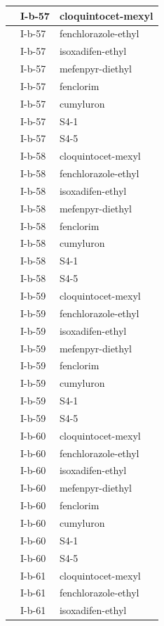 \documentclass[11pt,a4paper]{article}
\begin{document}
\begin{table}[h]
\begin{tabular}{|l|l|l|}
 & I-b-57 & cloquintocet-mexyl \\ \hline
 & I-b-57 & fenchlorazole-ethyl \\ \hline
 & I-b-57 & isoxadifen-ethyl \\ \hline
 & I-b-57 & mefenpyr-diethyl \\ \hline
 & I-b-57 & fenclorim \\ \hline
 & I-b-57 & cumyluron \\ \hline
 & I-b-57 & S4-1 \\ \hline
 & I-b-57 & S4-5 \\ \hline
 & I-b-58 & cloquintocet-mexyl \\ \hline
 & I-b-58 & fenchlorazole-ethyl \\ \hline
 & I-b-58 & isoxadifen-ethyl \\ \hline
 & I-b-58 & mefenpyr-diethyl \\ \hline
 & I-b-58 & fenclorim \\ \hline
 & I-b-58 & cumyluron \\ \hline
 & I-b-58 & S4-1 \\ \hline
 & I-b-58 & S4-5 \\ \hline
 & I-b-59 & cloquintocet-mexyl \\ \hline
 & I-b-59 & fenchlorazole-ethyl \\ \hline
 & I-b-59 & isoxadifen-ethyl \\ \hline
 & I-b-59 & mefenpyr-diethyl \\ \hline
 & I-b-59 & fenclorim \\ \hline
 & I-b-59 & cumyluron \\ \hline
 & I-b-59 & S4-1 \\ \hline
 & I-b-59 & S4-5 \\ \hline
 & I-b-60 & cloquintocet-mexyl \\ \hline
 & I-b-60 & fenchlorazole-ethyl \\ \hline
 & I-b-60 & isoxadifen-ethyl \\ \hline
 & I-b-60 & mefenpyr-diethyl \\ \hline
 & I-b-60 & fenclorim \\ \hline
 & I-b-60 & cumyluron \\ \hline
 & I-b-60 & S4-1 \\ \hline
 & I-b-60 & S4-5 \\ \hline
 & I-b-61 & cloquintocet-mexyl \\ \hline
 & I-b-61 & fenchlorazole-ethyl \\ \hline
 & I-b-61 & isoxadifen-ethyl \\ \hline

\end{tabular}
\end{table}
\end{document}
